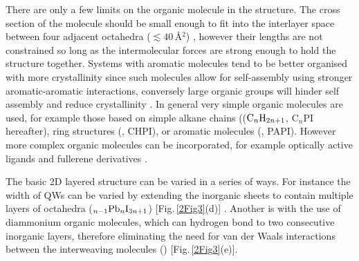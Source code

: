 There are only a few limits on the organic molecule  in the structure. The cross section of the molecule should be small enough to fit into the interlayer space between four adjacent octahedra ($\lesssim 40$\,\AA$^2$) \cite{Mitzi2001a}, however their lengths are not constrained so long as the intermolecular forces are strong enough to hold the structure together. Systems with aromatic molecules tend to be better organised with more crystallinity since such molecules allow for self-assembly using stronger aromatic-aromatic interactions, conversely large organic groups will hinder self assembly and reduce crystallinity \cite{Zhang2009}. In general very simple organic molecules are used, for example those based on simple alkane chains (($\textnormal{C}_n\textnormal{H}_{2n+1}$, C$_n$PI hereafter), ring structures (, CHPI), or aromatic molecules (, PAPI). However more complex organic molecules can be incorporated, for example optically active ligands \cite{Billing2006, Teshima2003} and fullerene derivatives \cite{Kikuchi2005, Kawabata2009}. 

The basic 2D layered structure can be varied in a series of ways. For instance the width of QWs	can be varied by extending the inorganic sheets to contain multiple layers of  octahedra ($_{n-1}\textnormal{Pb}_n\textnormal{I}_{3n+1}$) [Fig.\,\ref{2Fig3}(d)] \cite{Calabrese1991}. Another is with the use of diammonium organic molecules, which can hydrogen bond to two consecutive inorganic layers, therefore eliminating the need for van der Waals interactions between the interweaving molecules () [Fig.\,\ref{2Fig3}(e)].

